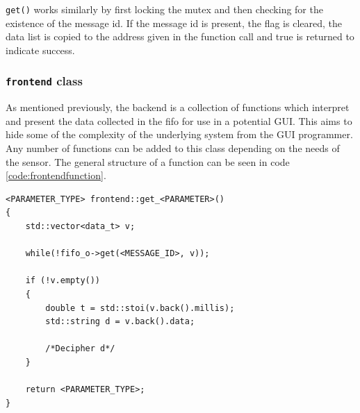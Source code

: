 \texttt{get()} works similarly by first locking the mutex and then checking for the existence of the message id.
If the message id is present, the flag is cleared, the data list is copied to the address given in the function call and true is returned to indicate success.

\subsubsection*{\texttt{frontend} class}
As mentioned previously, the backend is a collection of functions which interpret and present the data collected in the fifo for use in a potential GUI.
This aims to hide some of the complexity of the underlying system from the GUI programmer.
Any number of functions can be added to this class depending on the needs of the sensor.
The general structure of a function can be seen in code \ref{code:frontendfunction}.

\begin{lstlisting}[caption=Function template for accesing data in fifo.,label=code:frontendfunction]
<PARAMETER_TYPE> frontend::get_<PARAMETER>()
{
	std::vector<data_t> v;

	while(!fifo_o->get(<MESSAGE_ID>, v));

	if (!v.empty())
	{
		double t = std::stoi(v.back().millis);
		std::string d = v.back().data;

		/*Decipher d*/
	}

	return <PARAMETER_TYPE>;
}
\end{lstlisting}